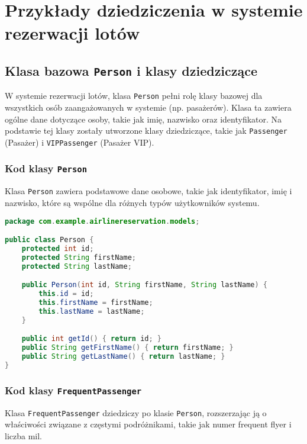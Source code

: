 \section{Przykłady dziedziczenia w systemie rezerwacji lotów}

\subsection{Klasa bazowa \texttt{Person} i klasy dziedziczące}

W systemie rezerwacji lotów, klasa \texttt{Person} pełni rolę klasy bazowej dla wszystkich osób zaangażowanych w systemie (np. pasażerów). Klasa ta zawiera ogólne dane dotyczące osoby, takie jak imię, nazwisko oraz identyfikator. Na podstawie tej klasy zostały utworzone klasy dziedziczące, takie jak \texttt{Passenger} (Pasażer) i \texttt{VIPPassenger} (Pasażer VIP).

\subsubsection{Kod klasy \texttt{Person}}

Klasa \texttt{Person} zawiera podstawowe dane osobowe, takie jak identyfikator, imię i nazwisko, które są wspólne dla różnych typów użytkowników systemu.

\begin{lstlisting}[language=Java, caption=Klasa Person]
package com.example.airlinereservation.models;

public class Person {
    protected int id;
    protected String firstName;
    protected String lastName;

    public Person(int id, String firstName, String lastName) {
        this.id = id;
        this.firstName = firstName;
        this.lastName = lastName;
    }

    public int getId() { return id; }
    public String getFirstName() { return firstName; }
    public String getLastName() { return lastName; }
}
\end{lstlisting}

\subsubsection{Kod klasy \texttt{FrequentPassenger}}

Klasa \texttt{FrequentPassenger} dziedziczy po klasie \texttt{Person}, rozszerzając ją o właściwości związane z częstymi podróżnikami, takie jak numer frequent flyer i liczba mil.

